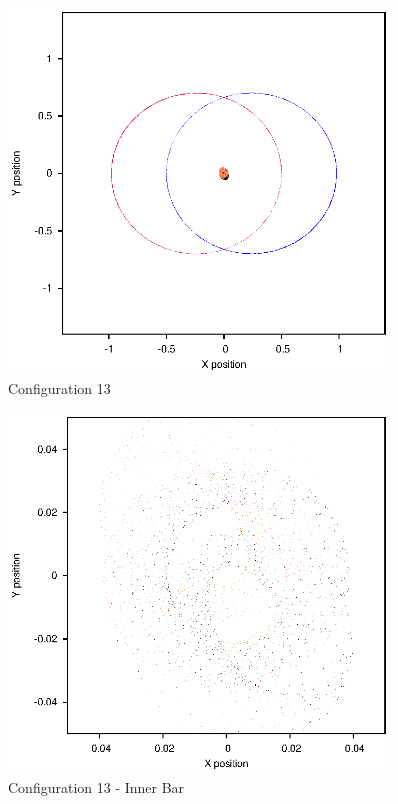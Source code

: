 \documentclass[a4paper,12pt]{article}
\begin{document}
\begin{figure}[H]
\centering
\includegraphics[width=0.9\textwidth]{./2017results/03-7-03-5/Orbit.eps}
\caption{Configuration 13}
\label{fig:config13}
\end{figure}
\begin{figure}[H]
\centering
\includegraphics[width=0.9\textwidth]{./2017results/03-7-03-5/Inner.eps}
\caption{Configuration 13 - Inner Bar}
\label{fig:config13i}
\end{figure}
\end{document}

